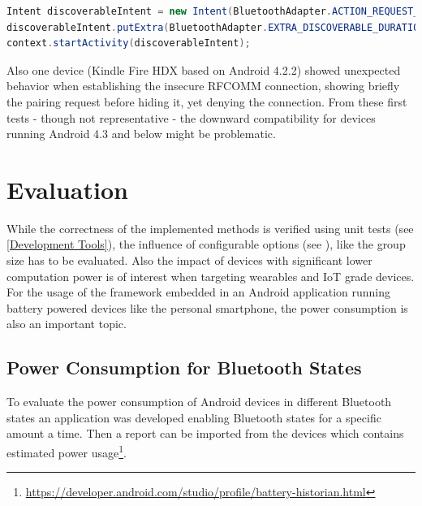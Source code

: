 \begin{lstlisting}[language=Java, caption={Android discoverable intent}, label={Android discoverable intent}, float, floatplacement=H]
Intent discoverableIntent = new Intent(BluetoothAdapter.ACTION_REQUEST_DISCOVERABLE);
discoverableIntent.putExtra(BluetoothAdapter.EXTRA_DISCOVERABLE_DURATION, 0);
context.startActivity(discoverableIntent);
\end{lstlisting}

Also one device (Kindle Fire HDX based on Android 4.2.2) showed unexpected behavior when establishing the insecure \gls{RFCOMM} connection, showing briefly the pairing request before hiding it, yet denying the connection. From these first tests - though not representative - the downward compatibility for devices running Android 4.3 and below might be problematic.

\FloatBarrier


\chapter{Evaluation} \label{Evaluation}

While the correctness of the implemented methods is verified using unit tests (see \autoref{Development Tools}), the influence of configurable options (see ), like the group size has to be evaluated. Also the impact of devices with significant lower computation power is of interest when targeting wearables and \gls{IoT} grade devices.
For the usage of the framework embedded in an Android application running battery powered devices like the personal smartphone, the power consumption is also an important topic.



\section{Power Consumption for Bluetooth States} \label{Power Consumption for Bluetooth States}

To evaluate the power consumption of Android devices in different Bluetooth states an application was developed enabling Bluetooth states for a specific amount a time. Then a report can be imported from the devices which contains estimated power usage\footnote{\url{https://developer.android.com/studio/profile/battery-historian.html}}.

